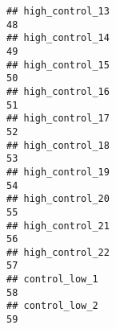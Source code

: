 \documentclass[
]{article}
\begin{document}
\begin{verbatim}
## high_control_13                                                                                                                                                                                                              48
## high_control_14                                                                                                                                                                                                              49
## high_control_15                                                                                                                                                                                                              50
## high_control_16                                                                                                                                                                                                              51
## high_control_17                                                                                                                                                                                                              52
## high_control_18                                                                                                                                                                                                              53
## high_control_19                                                                                                                                                                                                              54
## high_control_20                                                                                                                                                                                                              55
## high_control_21                                                                                                                                                                                                              56
## high_control_22                                                                                                                                                                                                              57
## control_low_1                                                                                                                                                                                                                58
## control_low_2                                                                                                                                                                                                                59

\end{verbatim}
\end{document}
